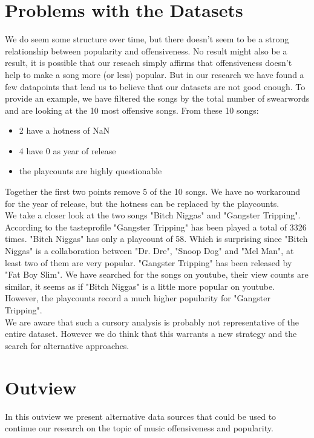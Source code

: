\documentclass[11pt]{article}
\begin{document}
\section{Problems with the Datasets}
We do seem some structure over time, but there doesn't seem to be a strong relationship between popularity and offensiveness.
No result might also be a result, it is possible that our reseach simply affirms that offensiveness doesn't help to make a song more (or less) popular.
But in our research we have found a few datapoints that lead us to believe that our datasets are not good enough.
To provide an example, we have filtered the songs by the total number of swearwords and are looking at the 10 most offensive songs.
From these 10 songs:
\begin{itemize}
  \item 2 have a hotness of NaN
  \item 4 have 0 as year of release
  \item the playcounts are highly questionable
\end{itemize}
Together the first two points remove 5 of the 10 songs. We have no workaround for the year of release, but the hotness can be replaced by the playcounts.\\
We take a closer look at the two songs "Bitch Niggas" and "Gangster Tripping". According to the tasteprofile "Gangster Tripping" has been played a total of 3326 times.
"Bitch Niggas" has only a playcount of 58. Which is surprising since "Bitch Niggas" is a collaboration between "Dr. Dre", "Snoop Dog" and "Mel Man", at least two of them are very popular.
"Gangster Tripping" has been released by "Fat Boy Slim". We have searched for the songs on youtube, their view counts are similar, it seems as if "Bitch Niggas" is a little more popular on youtube.
However, the playcounts record a much higher popularity for "Gangster Tripping".\\
We are aware that such a cursory analysis is probably not representative of the entire dataset.
However we do think that this warrants a new strategy and the search for alternative approaches.

\section{Outview}
In this outview we present alternative data sources that could be used to continue our research on the topic of music offensiveness and popularity.
\end{document}
